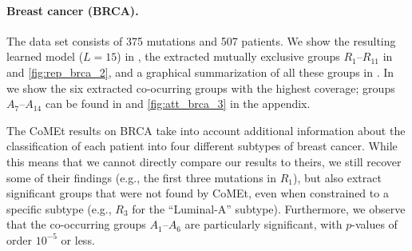 \paragraph{Breast cancer (BRCA).}
The data set consists of 375 mutations and 507 patients.
We show the resulting learned \fldc{} model ($L = 15$) in , the extracted mutually exclusive groups $R_1$--$R_{11}$ in  and \ref{fig:rep_brca_2}, and a graphical summarization of all these groups in .
In  we show the six extracted co-ocurring groups with the highest coverage; groups $A_7$--$A_{14}$ can be found in  and \ref{fig:att_brca_3} in the appendix.

The CoMEt results on BRCA take into account additional information about the classification of each patient into four different subtypes of breast cancer.
While this means that we cannot directly compare our results to theirs, we still recover some of their findings (e.g., the first three mutations in $R_1$), but also extract significant groups that were not found by CoMEt, even when constrained to a specific subtype (e.g., $R_3$ for the ``Luminal-A'' subtype).
Furthermore, we observe that the co-occurring groups $A_1$--$A_6$ are particularly significant, with $p$-values of order $10^{-5}$ or less.

